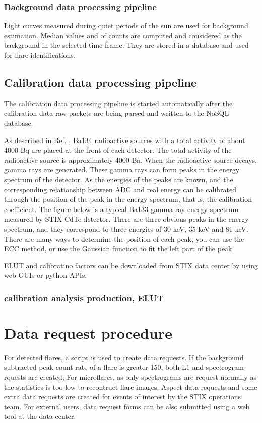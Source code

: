 \documentclass{aa}
\begin{document}
\subsubsection{Background data processing pipeline}
Light curves measured during quiet periods of the sun are used for background estimation. Median values and of counts are computed and considered as the background in the selected time frame. They are stored in a database and used for flare identifications. 

\subsection{Calibration data processing pipeline}
The calibration data processing pipeline is started automatically after the calibration data raw packets
are being parsed and written to the NoSQL database.


As described in Ref. \cite{StixInstrument},  Ba134 radioactive sources with a total activity of about 4000 Bq are placed at the front of each detector. The total activity of the radioactive source is approximately 4000 Ba.
When the radioactive source decays, gamma rays are generated. These gamma rays can form peaks in the energy spectrum of the detector.
As the energies of the peaks are known, and the corresponding relationship between ADC and real energy can be calibrated through the position of the peak in the energy spectrum, that is, the calibration coefficient. The figure below is a typical Ba133 gamma-ray energy spectrum measured by STIX CdTe detector. There are three obvious peaks in the energy spectrum, and they correspond to three energies of 30 keV, 35 keV and 81 keV. There are many ways to determine the position of each peak, you can use the ECC method, or use the Gaussian function to fit the left part of the peak.


ELUT and calibratino factors can be downloaded from STIX data center by using web GUIs or python APIs.
\subsubsection{calibration analysis production, ELUT}

\section{Data request procedure}

For detected flares,  a script is used to create data requests.
If the background subtracted peak count rate of a flare is greater 150,
both L1 and spectrogram rquests are created;  For microflares, as only
spectrograms are request normally as the statistics is too
low to recontruct flare images.  Aspect data requests
and some extra data requests are created for events of interest by the
STIX operations team.
For external users, data request forms can be also submitted using a web tool
at the data center.
\end{document}
